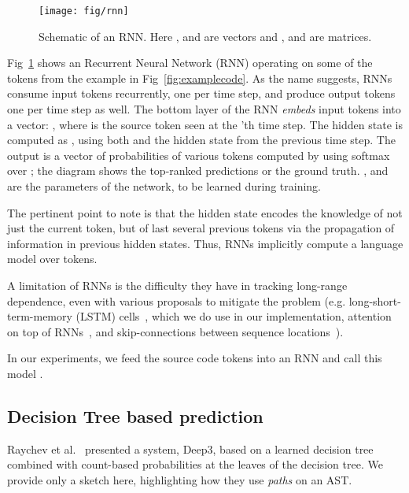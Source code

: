 \documentclass[nonacm, sigconf]{acmart}
\begin{document}
\begin{figure}
    \centering
    \texttt{[image: fig/rnn]}
    \caption{Schematic of an RNN. Here ,  and  are vectors and ,  and  are matrices.}
    \label{fig:rnn}
\end{figure}

Fig~\ref{fig:rnn} shows an Recurrent Neural Network (RNN) operating on some of the tokens from the example in Fig~\ref{fig:examplecode}.  As the name suggests, RNNs consume input tokens recurrently, one per time step, and produce output tokens one per time step as well.  The bottom layer of the RNN \emph{embeds} input tokens into a vector: , where  is the source token seen at the 'th time step.  The hidden state  is
computed as 
, 
using both  and the hidden state from the previous time step. The output is a vector of probabilities of various tokens computed by using softmax over ; the diagram shows the top-ranked predictions or the ground truth.  ,  and  are the parameters of the network, to be learned during training.

The pertinent point to note is that the hidden state  encodes the knowledge of not just the current token, but of last several previous tokens via the propagation of information in previous hidden states.  Thus, RNNs implicitly compute a language model over tokens.

A limitation of RNNs is the difficulty they have in tracking long-range dependence,  
even with various proposals to mitigate the problem (e.g. long-short-term-memory (LSTM) cells~\citep{hochreiter1997long-lstm}, which we do use in our implementation, attention on top of RNNs~\citep{iyer2016summarizing-lstm-attn}, and skip-connections between sequence locations~\citep{vinyals2015pointer}). 

In our experiments, we feed the source code tokens into an RNN and call this model \SrcRNN.


\subsection{Decision Tree based prediction}

Raychev et al.~\cite{raychev2016probabilistic-deep3-eth-dt}
presented a system, Deep3, based on a learned decision tree combined with count-based probabilities at the leaves of the decision tree.  We provide only a sketch here, highlighting how they use \emph{paths} on an AST.
\end{document}
